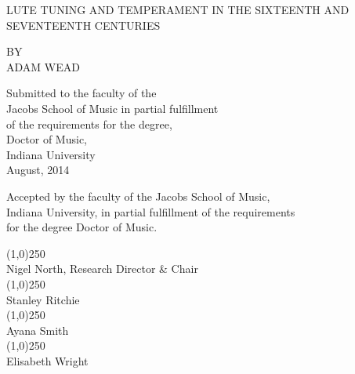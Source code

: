 \begin{titlepage}
  \begin{center}
    \vspace*{1cm}
    
    LUTE TUNING AND TEMPERAMENT IN THE SIXTEENTH AND SEVENTEENTH CENTURIES
    
    \vspace{1.5cm}
    
    BY\\
    ADAM WEAD\\
    
    \vfill
    
    \begin{centerblocks}
      Submitted to the faculty of the\\
      Jacobs School of Music in partial fulfillment\\
      of the requirements for the degree,\\
      Doctor of Music,\\ 
      Indiana University\\ 
      August, 2014\\
    \end{centerblocks}
    
    
  \end{center}
\end{titlepage}

\null
\vfill

\begin{centerblocks}
Accepted by the faculty of the Jacobs School of Music,\\
Indiana University, in partial fulfillment of the requirements\\
for the degree Doctor of Music.\\
\end{centerblocks}

\null
\vfill

\begin{blocks}
\hfill \line(1,0){250}\\
\hfill Nigel North, Research Director \& Chair\\
\vspace*{2\baselineskip}
\hfill \line(1,0){250}\\
\hfill Stanley Ritchie\\
\vspace*{2\baselineskip}
\hfill \line(1,0){250}\\
\hfill Ayana Smith\\
\vspace*{2\baselineskip}
\hfill \line(1,0){250}\\
\hfill Elisabeth Wright\\
\end{blocks}

